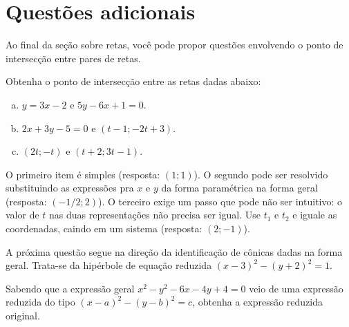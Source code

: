 \documentclass[main_estudante.tex]{subfiles}
\begin{document}
\section{Questões adicionais}

Ao final da seção sobre retas, você pode propor questões envolvendo o ponto de intersecção entre pares de retas.

\begin{adicional}
Obtenha o ponto de intersecção entre as retas dadas abaixo:
\begin{enumerate}[a)]
\item $y=3x-2$ e $5y-6x+1=0$.
\item $2x+3y-5=0$ e $(t-1;-2t+3)$.
\item $(2t;-t)$ e $(t+2;3t-1)$.
\end{enumerate} 
\end{adicional}

O primeiro item é simples (resposta: $(1;1)$). O segundo pode ser resolvido substituindo as expressões pra $x$ e $y$ da forma paramétrica na forma geral (resposta: $(-1/2;2)$). O terceiro exige um passo que pode não ser intuitivo: o valor de $t$ nas duas representações não precisa ser igual. Use $t_1$ e $t_2$ e iguale as coordenadas, caindo em um sistema (resposta: $(2;-1)$).

A próxima questão segue na direção da identificação de cônicas dadas na forma geral. Trata-se da hipérbole de equação reduzida $(x-3)^2-(y+2)^2=1$.

\begin{adicional}
Sabendo que a expressão geral $x^2-y^2-6x-4y+4=0$ veio de uma expressão reduzida do tipo $(x-a)^2-(y-b)^2=c$, obtenha a expressão reduzida original.
\end{adicional}
\end{document}
